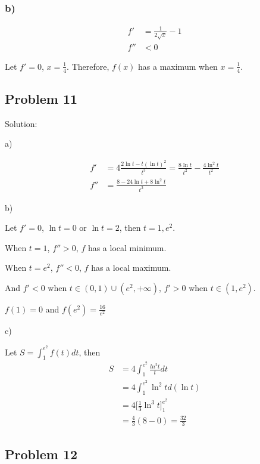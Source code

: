 \documentclass[letterpaper, 11pt]{article}
\newcommand{\1}{\mathds{1}}	%
\theoremstyle{definition}
\begin{document}
  \subsubsection*{b)}

  \begin{align*}
    f'  & = \frac{1}{2 \sqrt{x}} - 1 \\
    f'' & < 0
  \end{align*}

  Let $f' = 0$, $x = \frac{1}{4}$. Therefore, $f(x)$ has a maximum when $x = \frac{1}{4}$.


  \subsection*{Problem 11}

  Solution:

  a)

  \begin{align*}
    f'  & = 4 \frac{2 \ln t - t (\ln t) ^{2}}{t ^{3}} = \frac{8 \ln t}{t ^{2}} - \frac{4 \ln ^{2} t}{t ^{2}} \\
    f'' & = \frac{8 - 24 \ln t + 8 \ln ^{2} t}{t ^{3}}
  \end{align*}

  b)

  Let $f' = 0$, $\ln t = 0$ or $\ln t = 2$, then $t = 1, e ^{2}$.

  When $ t = 1$, $f'' > 0$, $f$ has a local minimum.

  When $ t = e ^{2}$, $f '' < 0$, $f$ has a local maximum.

  And $f' < 0$ when $t \in (0, 1) \cup (e ^{2}, +\infty)$, $f' > 0$ when $t \in (1, e ^{2})$.

$f(1) = 0$ and $f(e ^{2}) = \frac{16}{e ^{2}}$


  c)

  Let $S = \int_{1}^{e ^{2}} f(t)dt$, then
  \begin{align*}
    S & = 4\int_{1}^{e ^{2}} \frac{ln ^{2} t}{t} dt         \\
      & = 4 \int_{1}^{e ^{2}} \ln ^{2} t d(\ln t)           \\
      & = 4 \Big[ \frac{1}{3} \ln ^{3} t \Big]_{1}^{e ^{2}} \\
      & = \frac{4}{3}(8 - 0) = \frac{32}{3}
  \end{align*}


  \subsection*{Problem 12}
\end{document}

